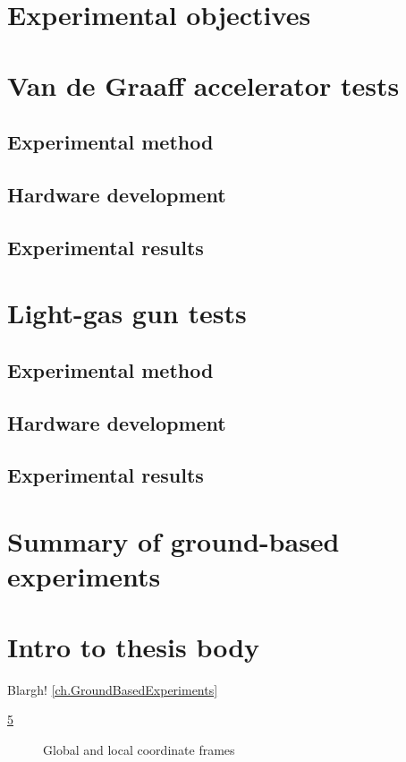 \section{Experimental objectives}

\section{Van de Graaff accelerator tests}
\subsection{Experimental method}
\subsection{Hardware development}
\subsection{Experimental results}

\section{Light-gas gun tests}
\subsection{Experimental method}
\subsection{Hardware development}
\subsection{Experimental results}

\section{Summary of ground-based experiments}

\section{Intro to thesis body}
\label{sec.IntroToThesisBody}
Blargh!
 \ref{ch.GroundBasedExperiments}
 
 \ref{sec.IntroToThesisBody}
\begin{figure}[htb]
\caption{Global and local coordinate frames}
\label{fig.coords}
\begin{center}
\end{center}
\end{figure}
\citep{zubrin1999}\\
\citep{mcinnes2003a}\\
\citep{zubrin1999,mcinnes2003a}\\
\citet{zubrin1999}\\
\citet{mcinnes2003a}\\
\citet{zubrin1999,mcinnes2003a}